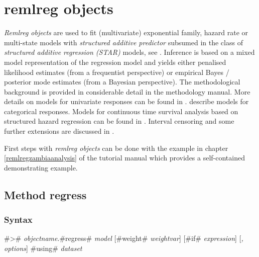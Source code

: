 \chapter{remlreg objects}\normalsize
\label{remlreg} 

{\em Remlreg objects} are used to fit (multivariate) exponential family, hazard rate or multi-state models with {\em structured
additive predictor} subsumed in the class of {\em structured additive regression (STAR)} models, see .
Inference is based on a mixed model representation of the regression model and yields either penalised likelihood estimates
(from a frequentist perspective) or empirical Bayes / posterior mode estimates (from a Bayesian perspective). The
methodological background is provided in considerable detail in the methodology manual. More details on models for univariate
responses can be found in .  describe models for categorical responses. Models for
continuous time survival analysis based on structured hazard regression can be found in . Interval
censoring and some further extensions are discussed in .

     

First steps with {\em remlreg objects} can be done with the
example in chapter \ref*{remlregzambiaanalysis} of the tutorial
manual which provides a self-contained demonstrating example.

\section{Method regress} \label{remlregregress}

\subsection{Syntax}
\label{remlregregresssyntax}

 #># {\em objectname}.#regress# {\em model} [#weight# {\em weightvar}] [#if# {\em expression}] [{\em , options}] #using# {\em dataset}

